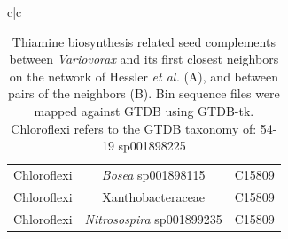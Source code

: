 \documentclass[sn-mathphys,Numbered]{sn-jnl}  %
\theoremstyle{thmstyleone}%
\theoremstyle{thmstyletwo}%
\theoremstyle{thmstylethree}%
\begin{document}
\begin{table}[ht]
\begin{minipage}{\linewidth}
\begin{adjustbox}{width=1.3\textwidth,center=\textwidth}
\begin{tabular}{c|c}
\begin{tabular}{ccc}
                            Chloroflexi & \textit{Bosea} sp001898115 & C15809 \\
                            Chloroflexi & Xanthobacteraceae & C15809 \\
                            Chloroflexi & \textit{Nitrosospira} sp001899235 & C15809 \\
                        \end{tabular} \\
                    \end{tabular} \\
                \end{adjustbox}
            \caption{ 
                Thiamine biosynthesis related seed complements between \textit{Variovorax} and its first closest neighbors on the network of Hessler \textit{et al.}\cite{hessler2023vitamin} (A), and between pairs of the neighbors (B).
                Bin sequence files were mapped against GTDB using GTDB-tk. 
                Chloroflexi refers to the GTDB taxonomy of: 54-19 sp001898225
            }
            \label{tab:Variovorax}
            \end{minipage}
            \end{table}
    
    




\end{document}

